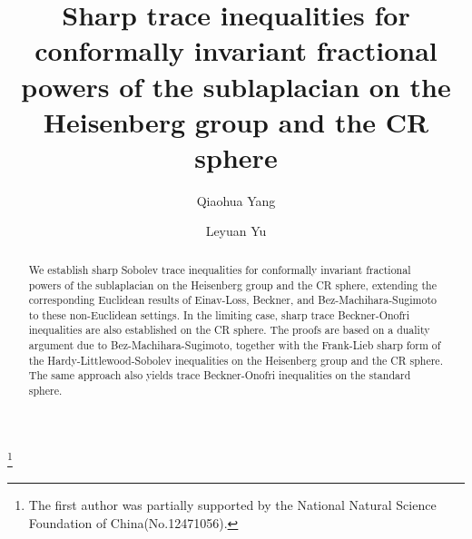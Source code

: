 \documentclass[12pt,reqno]{amsart}%
\theoremstyle{plain}
\numberwithin{equation}{section}
\begin{document}
\title[Sharp trace inequalities for
fractional powers of the sublaplacian]{Sharp  trace inequalities for conformally invariant fractional powers of the sublaplacian on the Heisenberg group and the CR sphere}




\author{Qiaohua  Yang}
\address{School of Mathematics and Statistics, Wuhan University, Wuhan, 430072, People's Republic of China}


\author{Leyuan Yu}

\address{School of Mathematics and Statistics, Wuhan University, Wuhan, 430072, People's Republic of China}










\thanks{The first  author  was partially supported by the National Natural Science Foundation of China(No.12471056).}






\begin{abstract}
We establish sharp Sobolev trace inequalities for conformally invariant fractional powers of the sublaplacian on the Heisenberg group and the CR sphere, extending the corresponding Euclidean results of Einav-Loss, Beckner, and Bez-Machihara-Sugimoto to these non-Euclidean settings.
In the limiting case, sharp trace Beckner-Onofri inequalities are also established on the CR sphere. The proofs are based on a duality argument due to Bez-Machihara-Sugimoto, together with the Frank-Lieb sharp form of the Hardy-Littlewood-Sobolev inequalities on the Heisenberg group and the CR sphere.
The same approach also yields trace Beckner-Onofri inequalities on the standard sphere.

  \end{abstract}
\end{document}
